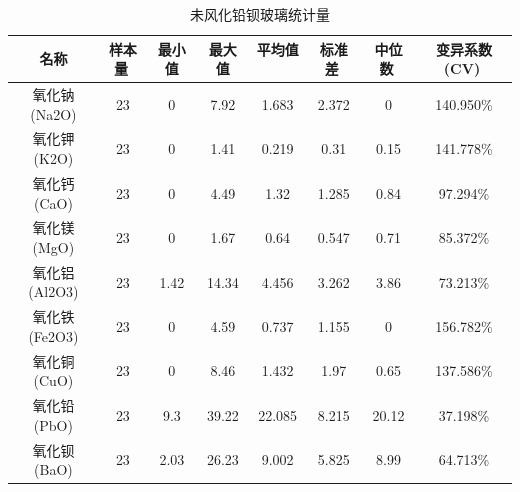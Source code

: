 \documentclass{my_paper}
\begin{document}
\begin{enumerate}
\begin{itemize}
        \begin{longtable}{cccccccc}
        \caption{未风化铅钡玻璃统计量}
        \label{index3} \\
        \toprule
            名称                   & 样本量                 & 最小值                  & 最大值                  & 平均值                 & 标准差                 & 中位数                 & 变异系数(CV)            \\
            \midrule
            氧化钠(Na2O)            & 23                   & 0                    & 7.92                 & 1.683                & 2.372                & 0                    & 140.950\%            \\
            氧化钾(K2O)             & 23                   & 0                    & 1.41                 & 0.219                & 0.31                 & 0.15                 & 141.778\%            \\
            氧化钙(CaO)             & 23                   & 0                    & 4.49                 & 1.32                 & 1.285                & 0.84                 & 97.294\%             \\
            氧化镁(MgO)             & 23                   & 0                    & 1.67                 & 0.64                 & 0.547                & 0.71                 & 85.372\%             \\
            氧化铝(Al2O3)           & 23                   & 1.42                 & 14.34                & 4.456                & 3.262                & 3.86                 & 73.213\%             \\
            氧化铁(Fe2O3)           & 23                   & 0                    & 4.59                 & 0.737                & 1.155                & 0                    & 156.782\%            \\
            氧化铜(CuO)             & 23                   & 0                    & 8.46                 & 1.432                & 1.97                 & 0.65                 & 137.586\%            \\
            氧化铅(PbO)             & 23                   & 9.3                  & 39.22                & 22.085               & 8.215                & 20.12                & 37.198\%             \\
            氧化钡(BaO)             & 23                   & 2.03                 & 26.23                & 9.002                & 5.825                & 8.99                 & 64.713\%             \\

\end{longtable}
\end{itemize}
\end{enumerate}
\end{document}
